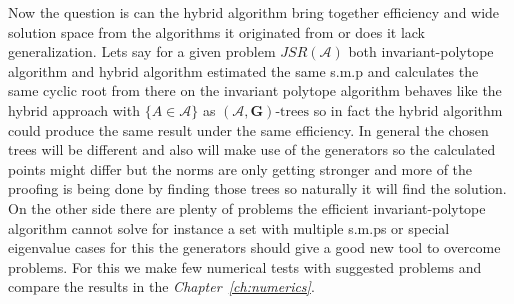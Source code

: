 Now the question is can the hybrid algorithm bring together efficiency and wide solution space from the algorithms it originated from or does it lack generalization. 
Lets say for a given problem $JSR(\mathcal{A})$ both invariant-polytope algorithm and hybrid algorithm estimated the same s.m.p and calculates the same cyclic root from there on the invariant polytope algorithm behaves like the hybrid approach with $\{A \in \mathcal{A}\}$ as $(\mathcal{A},\mathbf{G})\text{-trees}$ so in fact the hybrid algorithm could produce the same result under the same efficiency. In general the chosen trees will be different and also will make use of the generators so the calculated points might differ but the norms are only getting stronger and more of the proofing is being done by finding those trees so naturally it will find the solution. 
On the other side there are plenty of problems the efficient invariant-polytope algorithm cannot solve for instance a set with multiple s.m.ps or special eigenvalue cases for this the generators should give a good new tool to overcome problems. For this we make few numerical tests with suggested problems and compare the results in the \emph{Chapter~\ref{ch:numerics}}.